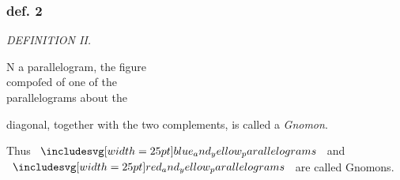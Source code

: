 \documentclass[11pt,preview]{standalone}
\begin{document}
\subsubsection{def. 2}

\begin{minipage}[t]{0.43\textwidth}
    \vspace{18pt}
    
\end{minipage}%
\hfill
\begin{minipage}[t]{0.54\textwidth}
    \begin{center}
        \textit{DEFINITION II.}\label{book2def2} \\
    \end{center}

    \hfill

    \begin{center}
        \raggedright \lettrine[lines=3, loversize=1, nindent=0pt]{}{}N a parallelogram, the figure\\ compoſed of one of the\\ parallelograms about the
    \end{center}
    \raggedright diagonal, together with the two complements, is called a \textit{Gnomon}.
\end{minipage}%

\hfill

\hfill

\hfill

\begin{center}
    Thus $\img{blue_and_yellow_parallelograms}$ and $\img{red_and_yellow_parallelograms}$ are called Gnomons.
\end{center}
\end{document}
